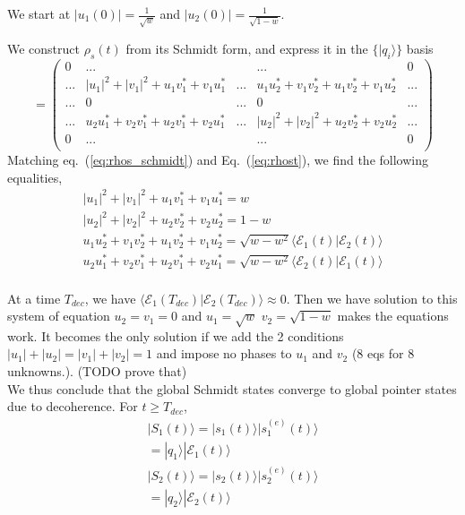 \documentclass{article}
\begin{document}
We start at $|u_1(0)|=\frac{1}{\sqrt{w}}$ and $|u_2(0)|=\frac{1}{\sqrt{1-w}}$. 

We construct $\rho_s(t)$ from its Schmidt form, and express it in the $\{|q_i\rangle\}$ basis
\begin{equation}
    =\begin{pmatrix}
        0 & ... & & ... & 0 \\
        ... & |u_1|^2+|v_1|^2+u_1v_1^*+v_1u_1^* & ... & u_1u_2^*+v_1v_2^*+u_1v_2^*+v_1u_2^* & ... \\
        ... & 0 & ... & 0 & ... \\
        ... & u_2u_1^*+v_2v_1^*+u_2v_1^*+v_2u_1^* & ... & |u_2|^2+|v_2|^2+u_2v_2^*+v_2u_2^* & ... \\
        0 & ... & & ... & 0 \\
    \end{pmatrix}
    \label{eq:rhos_schmidt}
\end{equation}
Matching eq.~(\ref{eq:rhos_schmidt}) and Eq.~(\ref{eq:rhost}), we find the following equalities,
\begin{align*}
    |u_1|^2+|v_1|^2+u_1v_1^*+v_1u_1^* = w\\
    |u_2|^2+|v_2|^2+u_2v_2^*+v_2u_2^* = 1-w\\
    u_1u_2^*+v_1v_2^*+u_1v_2^*+v_1u_2^* = \sqrt{w-w^2}\langle\mathcal{E}_1(t)|\mathcal{E}_2(t)\rangle\\
    u_2u_1^*+v_2v_1^*+u_2v_1^*+v_2u_1^* = \sqrt{w-w^2}\langle \mathcal{E}_2(t)|\mathcal{E}_1(t)\rangle\\
\end{align*}

At a time $T_{dec}$, we have $\langle \mathcal{E}_1(T_{dec})|\mathcal{E}_2(T_{dec})\rangle\approx0$. Then we have solution to this system of equation $u_2=v_1=0$ and $u_1=\sqrt{w}$ $v_2=\sqrt{1-w}$ makes the equations work. It becomes the only solution if we add the 2 conditions $|u_1|+|u_2|=|v_1|+|v_2|=1$ and impose no phases to $u_1$ and $v_2$  (8 eqs for 8 unknowns.). (TODO prove that)\\

We thus conclude that the global Schmidt states converge to global pointer states due to decoherence. For $t\geq T_{dec}$,
\begin{align*}
    |S_1(t)\rangle = |s_1(t)\rangle|s^{(e)}_1(t)\rangle\\
    =|q_1\rangle|\mathcal{E}_1(t)\rangle
    \\
    |S_2(t)\rangle = |s_2(t)\rangle|s^{(e)}_2(t)\rangle\\
    =|q_2\rangle|\mathcal{E}_2(t)\rangle
\end{align*}
\end{document}
